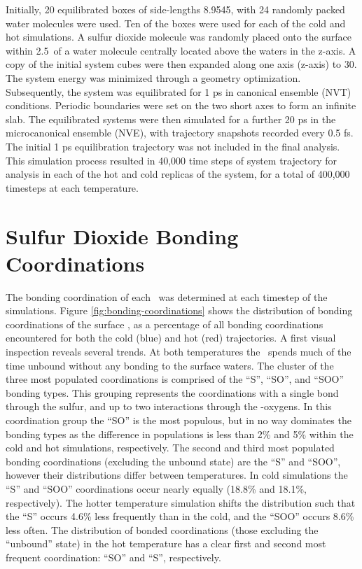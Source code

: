 \documentclass{article}
\begin{document}
Initially, 20 equilibrated boxes of side-lengths 8.9545\angs, with 24 randomly packed water molecules were used. Ten of the boxes were used for each of the cold and hot simulations. A sulfur dioxide molecule was randomly placed onto the surface within 2.5\angs~of a water molecule centrally located above the waters in the z-axis. A copy of the initial system cubes were then expanded along one axis (z-axis) to 30\angs. The system energy was minimized through a geometry optimization. Subsequently, the system was equilibrated for 1 ps in canonical ensemble (NVT) conditions. Periodic boundaries were set on the two short axes to form an infinite slab. The equilibrated systems were then simulated for a further 20 ps in the microcanonical ensemble (NVE), with trajectory snapshots recorded every 0.5 fs. The initial 1 ps equilibration trajectory was not included in the final analysis. This simulation process resulted in 40,000 time steps of system trajectory for analysis in each of the hot and cold replicas of the system, for a total of 400,000 timesteps at each temperature.

\section {Sulfur Dioxide Bonding Coordinations}

The bonding coordination of each \suldiox~was determined at each timestep of the simulations. Figure \ref{fig:bonding-coordinations} shows the distribution of bonding coordinations of the surface \suldiox, as a percentage of all bonding coordinations encountered for both the cold (blue) and hot (red) trajectories. A first visual inspection reveals several trends. At both temperatures the \suldiox~spends much of the time unbound without any bonding to the surface waters. The cluster of the three most populated coordinations is comprised of the ``S'', ``SO'', and ``SOO'' bonding types. This grouping represents the coordinations with a single bond through the sulfur, and up to two interactions through the \suldiox-oxygens. In this coordination group the ``SO'' is the most populous, but in no way dominates the bonding types as the difference in populations is less than 2\% and 5\% within the cold and hot simulations, respectively. The second and third most populated bonding coordinations (excluding the unbound state) are the ``S'' and ``SOO'', however their distributions differ between temperatures. In cold simulations the ``S'' and ``SOO'' coordinations occur nearly equally (18.8\% and 18.1\%, respectively). The hotter temperature simulation shifts the distribution such that the ``S'' occurs 4.6\% less frequently than in the cold, and the ``SOO'' occurs 8.6\% less often. The distribution of bonded coordinations (those excluding the ``unbound'' state) in the hot temperature has a clear first and second most frequent coordination: ``SO'' and ``S'', respectively. 
\end{document}
